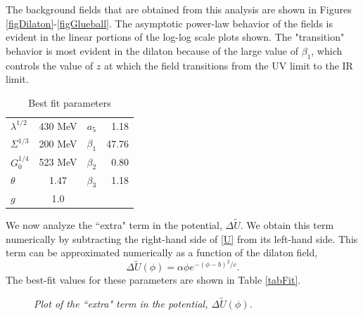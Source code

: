 \documentclass[12pt]{article}
\newcommand{\be}{\begin{equation}}
\newcommand{\ee}{\end{equation}}
\begin{document}
The background fields that are obtained from this analysis are shown in Figures \ref{figDilaton}-\ref{figGlueball}. The asymptotic power-law behavior of the fields is evident in the linear portions of the log-log scale plots shown. The "transition" behavior is most evident in the dilaton because of the large value of $\beta_1$, which controls the value of $z$ at which the field transitions from the UV limit to the IR limit. 

\begin{table}[htb]
\begin{center}
\begin{tabular}{| l | c || c | r | }
\hline
  $\lambda^{1/2}$ & $430$ MeV & $a_5$ & 1.18 \\
  $\Sigma^{1/3}$ &  200 MeV & $\beta_1$ & 47.76\\
  $G_0^{1/4}$ & 523 MeV &  $\beta_2$ & 0.80 \\
 $ \theta $& 1.47 & $\beta_3$ & 1.18 \\
  $g $& 1.0 & & \\
  \hline
\end{tabular}
\caption{Best fit parameters}
\label{tabParam}
\end{center}
\end{table}


We now analyze the ``extra" term in the potential, $\Delta \tilde{U}$. 
We obtain this term numerically by subtracting the right-hand side of \ref{U} from its left-hand side.
This term can be approximated numerically as a function of the dilaton field, 
\be
\Delta \tilde{U}\left(\phi\right) = \alpha \phi e^{-\left(\phi-b\right)^2/c } .
\ee
The best-fit values for these parameters are shown in Table \ref{tabFit}.

\begin{figure}[htb]
\caption{\textit{Plot of the ``extra" term in the potential, $\Delta \tilde{U}(\phi)$.}}
\label{figdeltaU}
\end{figure}
\end{document}

